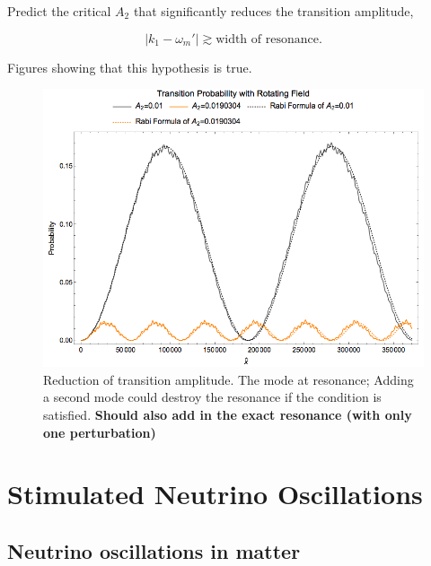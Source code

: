 \documentclass[%
preprint,
 amsmath,amssymb,
 aps,
]{revtex4-1}
\begin{document}
Predict the critical $A_2$ that significantly reduces the transition amplitude,

\begin{equation}
\lvert k_1 - \omega_m' \rvert \gtrsim \text{width of resonance}.
\end{equation}




Figures showing that this hypothesis is true.


\begin{figure}[!htbp]
                \centering
                \includegraphics[width=\textwidth]{assets/resonance-freq-example-1-added-new-slow-perturbation-destruction-compare-rotating-field.png}
                \caption{Reduction of transition amplitude. The mode at resonance; Adding a second mode could destroy the resonance if the condition is satisfied. {\bf Should also add in the exact resonance (with only one perturbation)} }
                \label{fig-resonance-freq-example-1-added-new-slow-perturbation-destruction-compare-rotating-field}
\end{figure}





\section{\label{stimulated}Stimulated Neutrino Oscillations}



\subsection{Neutrino oscillations in matter}
\end{document}
